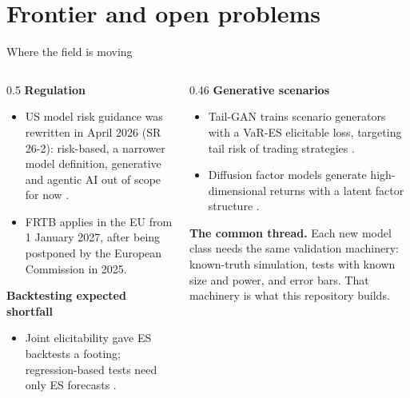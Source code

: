 \section{Frontier and open problems}

\begin{frame}{Where the field is moving}
  \small
  \begin{columns}[T]
    \begin{column}{0.5\textwidth}
      \textbf{Regulation}
      \begin{itemize}
        \item US model risk guidance was rewritten in April 2026 (SR 26-2): risk-based, a narrower model definition, generative and agentic AI out of scope for now \citep{fed2026sr262}.
        \item FRTB applies in the EU from 1 January 2027, after being postponed by the European Commission in 2025.
      \end{itemize}
      \textbf{Backtesting expected shortfall}
      \begin{itemize}
        \item Joint elicitability \citep{fissler2016higher} gave ES backtests a footing; regression-based tests need only ES forecasts \citep{bayer2022regression}.
      \end{itemize}
    \end{column}
    \begin{column}{0.46\textwidth}
      \textbf{Generative scenarios}
      \begin{itemize}
        \item Tail-GAN trains scenario generators with a VaR-ES elicitable loss, targeting tail risk of trading strategies \citep{cont2022tailgan}.
        \item Diffusion factor models generate high-dimensional returns with a latent factor structure \citep{chen2025diffusion}.
      \end{itemize}
      \textbf{The common thread.} Each new model class needs the same validation machinery: known-truth simulation, tests with known size and power, and error bars. That machinery is what this repository builds.
    \end{column}
  \end{columns}
\end{frame}

